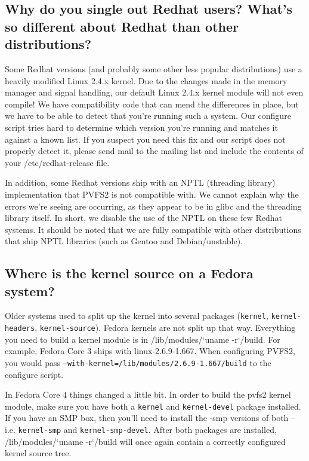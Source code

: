 \documentclass[11pt,letterpaper]{article}
\begin{document}
\subsection{Why do you single out Redhat users?  What's so different
  about Redhat than other distributions?}

Some Redhat versions (and probably some other less popular
distributions) use a heavily modified Linux 2.4.x kernel.  Due to the
changes made in the memory manager and signal handling, our default
Linux 2.4.x kernel module will not even compile!  We have
compatibility code that can mend the differences in place, but we have
to be able to detect that you're running such a system.  Our configure
script tries hard to determine which version you're running and
matches it against a known list.  If you suspect you need this fix and
our script does not properly detect it, please send mail to the
mailing list and include the contents of your /etc/redhat-release
file.

In addition, some Redhat versions ship with an NPTL (threading
library) implementation that PVFS2 is not compatible with.  We cannot
explain why the errors we're seeing are occurring, as they appear to be
in glibc and the threading library itself.  In short, we disable the
use of the NPTL on these few Redhat systems.  It should be noted that
we are fully compatible with other distributions that ship NPTL
libraries (such as Gentoo and Debian/unstable).

\subsection{Where is the kernel source on a Fedora system?}

Older systems used to split up the kernel into several packages
(\texttt{kernel}, \texttt{kernel-headers}, \texttt{kernel-source}).
Fedora kernels are not split up that way.  Everything you need to build a
kernel module is in /lib/modules/`uname -r`/build.  For example, Fedora
Core 3 ships with linux-2.6.9-1.667.  When configuring PVFS2, you would
pass \texttt{--with-kernel=/lib/modules/2.6.9-1.667/build} to the
configure script.

In Fedora Core 4 things changed a little bit.  In order to build the pvfs2
kernel module, make sure you have both a \texttt{kernel} and
\texttt{kernel-devel} package installed.  If you have an SMP box, then you'll
need to install the -smp versions of both -- i.e. \texttt{kernel-smp} and
\texttt{kernel-smp-devel}.   After both packages are installed,
/lib/modules/`uname -r`/build will once again contain a correctly configured
kernel source tree.
\end{document}
